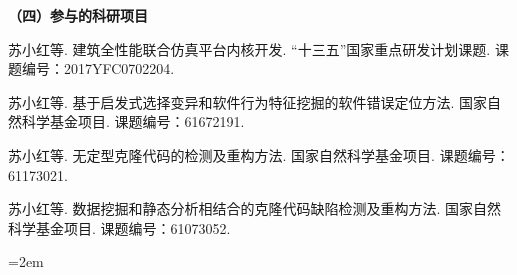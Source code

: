 \noindent\textbf{（四）参与的科研项目}
\begin{publist}

\item
苏小红等. 建筑全性能联合仿真平台内核开发. “十三五”国家重点研发计划课题. 课题编号：2017YFC0702204.
\item	
苏小红等. 基于启发式选择变异和软件行为特征挖掘的软件错误定位方法. 国家自然科学基金项目. 课题编号：61672191.
\item	
苏小红等. 无定型克隆代码的检测及重构方法. 国家自然科学基金项目. 课题编号：61173021.
\item
苏小红等. 数据挖掘和静态分析相结合的克隆代码缺陷检测及重构方法. 国家自然科学基金项目. 课题编号：61073052.

\end{publist}
\vfill
{}\hangindent=2em\noindent

\setlength{\parindent}{2em}
